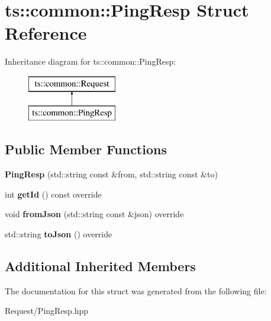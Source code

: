 \hypertarget{structts_1_1common_1_1_ping_resp}{}\section{ts\+:\+:common\+:\+:Ping\+Resp Struct Reference}
\label{structts_1_1common_1_1_ping_resp}
Inheritance diagram for ts\+:\+:common\+:\+:Ping\+Resp\+:\begin{figure}[H]
\begin{center}
\leavevmode
\includegraphics[height=2.000000cm]{structts_1_1common_1_1_ping_resp}
\end{center}
\end{figure}
\subsection*{Public Member Functions}
\begin{DoxyCompactItemize}
\item 
\mbox{\label{structts_1_1common_1_1_ping_resp_a3e05fef64cc758593e380d63c9db3a39}} 
{\bfseries Ping\+Resp} (std\+::string const \&from, std\+::string const \&to)
\item 
\mbox{\label{structts_1_1common_1_1_ping_resp_af57c3c4e352c3b86e2c380506eb257be}} 
int {\bfseries get\+Id} () const override
\item 
\mbox{\label{structts_1_1common_1_1_ping_resp_a890c9c10fc302185d059af03bebbb79f}} 
void {\bfseries from\+Json} (std\+::string const \&json) override
\item 
\mbox{\label{structts_1_1common_1_1_ping_resp_ab0d431ae3c8cbdf197c34579b901c7ca}} 
std\+::string {\bfseries to\+Json} () override
\end{DoxyCompactItemize}
\subsection*{Additional Inherited Members}


The documentation for this struct was generated from the following file\+:\begin{DoxyCompactItemize}
\item 
Request/Ping\+Resp.\+hpp\end{DoxyCompactItemize}
